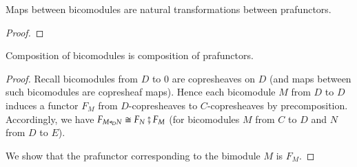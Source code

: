 \documentclass{amsart}
\begin{document}
\begin{prop}
  Maps between bicomodules are natural transformations between prafunctors.
\end{prop}
\begin{proof}
  
\end{proof}

\begin{prop}
  Composition of bicomodules is composition of prafunctors.
\end{prop}
\begin{proof}
  Recall bicomodules from $D$ to $0$ are copresheaves on $D$ (and maps
  between such bicomodules are copresheaf maps). Hence each bicomodule
  $M$ from $D$ to $D$ induces a functor $F_M$ from $D$-copresheaves to
  $C$-copresheaves by precomposition. Accordingly, we have
  $F_{M \mathrel{\triangleleft}_D N} \cong F_N \fatsemi F_M$ (for bicomodules $M$
  from $C$ to $D$ and $N$ from $D$ to $E$).
  
  We show that the prafunctor corresponding to the bimodule $M$ is $F_M$. 
\end{proof}
\end{document}

